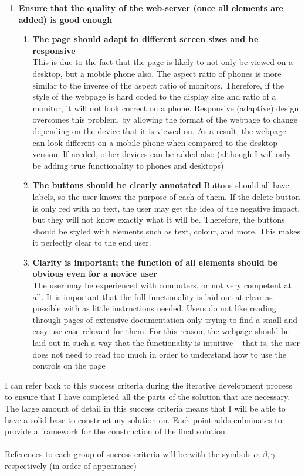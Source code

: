 \documentclass[9pt]{article}
\begin{document}
\begin{small}
\begin{enumerate}
		\item \textbf{Ensure that the quality of the web-server (once all elements are added) is good enough}
		\begin{enumerate}
			\item \textbf{The page should adapt to different screen sizes and be responsive}\\
				This is due to the fact that the page is likely to not only be viewed on a desktop, but a mobile phone also. The aspect ratio of phones is more similar to the inverse of the aspect ratio of monitors. Therefore, if the style of the webpage is hard coded to the display size and ratio of a monitor, it will not look correct on a phone. Responsive (adaptive) design overcomes this problem, by allowing the format of the webpage to change depending on the device that it is viewed on. As a result, the webpage can look different on a mobile phone when compared to the desktop version. If needed, other devices can be added also (although I will only be adding true functionality to phones and desktops)
			\item \textbf{The buttons should be clearly annotated}
				Buttons should all have labels, so the user knows the purpose of each of them. If the delete button is only red with no text, the user may get the idea of the negative impact, but they will not know exactly what it will be. Therefore, the buttons should be styled with elements such as text, colour, and more. This makes it perfectly clear to the end user. 
			\item \textbf{Clarity is important; the function of all elements should be obvious even for a novice user}\\
				The user may be experienced with computers, or not very competent at all. It is important that the full functionality is laid out at clear as possible with as little instructions needed. Users do not like reading through pages of extensive documentation only trying to find a small and easy use-case relevant for them. For this reason, the webpage should be laid out in such a way that the functionality is intuitive – that is, the user does not need to read too much in order to understand how to use the controls on the page
		\end{enumerate}
	\end{enumerate}
\end{small}
I can refer back to this success criteria during the iterative development process to ensure that I have completed all the parts of the solution that are necessary. The large amount of detail in this success criteria means that I will be able to have a solid base to construct my solution on. Each point adds culminates to provide a framework for the construction of the final solution.\\\\
References to each group of success criteria will be with the symbols $\alpha,\beta,\gamma$ respectively (in order of appearance)
\newpage
\end{document}
